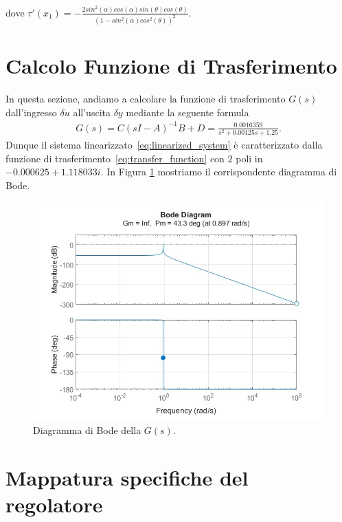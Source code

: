 \documentclass[a4paper, 11pt]{article}
\begin{document}
	dove $\tau'(x_1)= - \frac{2sin^2(\alpha)cos(\alpha)sin(\theta)cos(\theta)} 
	{(1-sin^2(\alpha)cos^2(\theta))^2}$.
	\section{Calcolo Funzione di Trasferimento}
	
	In questa sezione, andiamo a calcolare la funzione di trasferimento $G(s)$ dall'ingresso $\delta u$ all'uscita $\delta y$ mediante la seguente formula 
	\begin{align}\label{eq:transfer_function}
		G(s) = C(sI - A)^{-1}B+D = \frac{0.0016359}{s^2 + 0.00125 s + 1.25}.
	\end{align}
	Dunque il sistema linearizzato~\eqref{eq:linearized_system} è caratterizzato dalla funzione di trasferimento~\eqref{eq:transfer_function} con $2$ poli in $-0.000625 + 1.118033i$. In Figura \ref{fig:G} mostriamo il corrispondente diagramma di Bode. 
	
	\begin{figure}[h]
		\centering
		\includegraphics[width=0.5\linewidth]{BodeDiagramWithouthPatch2025.jpg}
		\caption{Diagramma di Bode della $G(s)$.}
		\label{fig:G}
	\end{figure}
	
	\newcommand{\dB}{\text{dB}}
	
	\section{Mappatura specifiche del regolatore}
	\label{sec:specifications}
	
\end{document}
